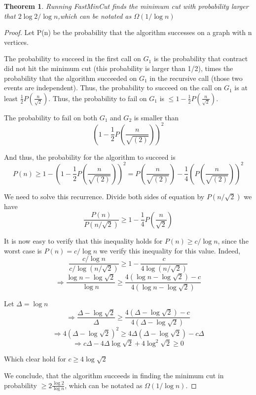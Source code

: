 \documentclass[11pt]{article}
\theoremstyle{plain}
\newtheorem{thm}{Theorem}[section]
\theoremstyle{definition}
\theoremstyle{remark}
\begin{document}
	\begin{thm}
	Running FastMinCut finds the minimum cut with probability larger that $ 2\log 2/ \log n $,which can be notated as $ \Omega(1/\log n) $
	\end{thm}
	\begin{proof}
	Let P(n) be the probability that the algorithm successes on a graph with n vertices. 
	
	The probability to succeed in the first call on $ G_1 $ is the probability that contract did not hit the minimum cut (this probability is larger than 1/2), times the probability that the algorithm succeeded on $ G_1 $ in the recursive call (those two events are independent). Thus, the probability to succeed on the call on $ G_1 $ is at least $ \frac{1}{2}P(\frac{n}{\sqrt{2}}) $. Thus, the probability to fail on $ G_1 $ is $ \leq 1-\frac{1}{2}P(\frac{n}{\sqrt{2}}) $.
	
	The probability to fail on both $ G_1 $ and $ G_2 $ is smaller than \[ (1-\frac{1}{2}P(\frac{n}{\sqrt{(2)}}))^2 \]
	
	And thus, the probability for the algorithm to succeed is \[ P(n)\geq 1-(1-\frac{1}{2}P(\frac{n}{\sqrt{(2)}}))^2 = P(\frac{n}{\sqrt{(2)}})-\frac{1}{4}(P(\frac{n}{\sqrt{(2)}}))^2 \]
	
	We need to solve this recurrence. Divide both sides of equation by $ P(n/\sqrt{2}) $ we have \[ \frac{P(n)}{P(n/\sqrt{2})} \geq 1- \frac{1}{4}P(\frac{n}{\sqrt{2}}) \]
	
	It is now easy to verify that this inequality holds for $ P(n)\geq c/\log n $, since the worst case is $ P(n)=c/\log n $ we verify this inequality for this value. Indeed, 
	\[ \frac{c/\log n}{c/\log(n/\sqrt{2})} \geq 1- \frac{c}{4\log(n/\sqrt{2})} \]
	\[\Rightarrow \frac{\log n- \log \sqrt{2}}{\log n} \geq \frac{4(\log n - \log \sqrt{2})-c}{4(\log n - \log \sqrt{2})} \]
	
	Let $ \Delta= \log n $
	\[\Rightarrow \frac{\Delta-\log \sqrt{2}}{\Delta} \geq \frac{4(\Delta-\log \sqrt{2})-c}{4(\Delta-\log \sqrt{2})} \]
	\[\Rightarrow 4(\Delta-\log \sqrt{2})^2 \geq 4\Delta (\Delta -\log \sqrt{2})-c\Delta \]
	\[\Rightarrow c\Delta -4\Delta \log \sqrt{2} + 4 \log^2 \sqrt{2} \geq 0  \]
	
	Which clear hold for $ c\geq 4\log \sqrt{2} $
	
	We conclude, that the algorithm succeeds in finding the minimum cut in probability $ \geq 2\frac{\log 2}{\log n} $, which can be notated as $ \Omega(1/\log n) $.
	\end{proof}
	
\end{document}
